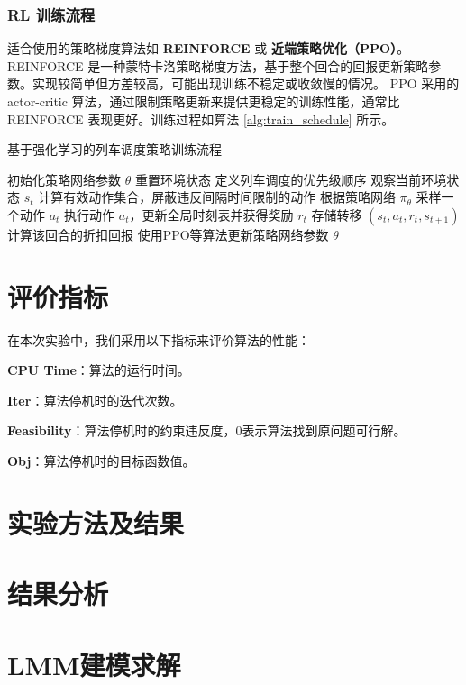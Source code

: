 \documentclass{article}
\begin{document}
\subsubsection{RL 训练流程}
适合使用的策略梯度算法如 \textbf{REINFORCE} 或 \textbf{近端策略优化（PPO）}。
REINFORCE 是一种蒙特卡洛策略梯度方法，基于整个回合的回报更新策略参数。实现较简单但方差较高，可能出现训练不稳定或收敛慢的情况。
PPO 采用的 actor-critic 算法，通过限制策略更新来提供更稳定的训练性能，通常比 REINFORCE
表现更好。训练过程如算法 \ref{alg:train_schedule} 所示。
\begin{algorithm}[ht]
    \caption{基于强化学习的列车调度策略训练流程}
    \label{alg:train_schedule}
    \begin{algorithmic}[1]
        \State 初始化策略网络参数 $\theta$
        \Repeat
        \State 重置环境状态
        \State 定义列车调度的优先级顺序
        \State 观察当前环境状态 $s_t$
        \State 计算有效动作集合，屏蔽违反间隔时间限制的动作
        \State 根据策略网络 $\pi_\theta$ 采样一个动作 $a_t$
        \State 执行动作 $a_t$，更新全局时刻表并获得奖励 $r_t$
        \State 存储转移 $(s_t, a_t, r_t, s_{t+1})$
        \EndFor
        \State 计算该回合的折扣回报
        \State 使用PPO等算法更新策略网络参数 $\theta$
    \end{algorithmic}
\end{algorithm}

\section{评价指标}
在本次实验中，我们采用以下指标来评价算法的性能：

\textbf{CPU Time}：算法的运行时间。

\textbf{Iter}：算法停机时的迭代次数。

\textbf{Feasibility}：算法停机时的约束违反度，$0$表示算法找到原问题可行解。

\textbf{Obj}：算法停机时的目标函数值。

\section{实验方法及结果}

\section{结果分析}

\section{LMM建模求解}
\end{document}
